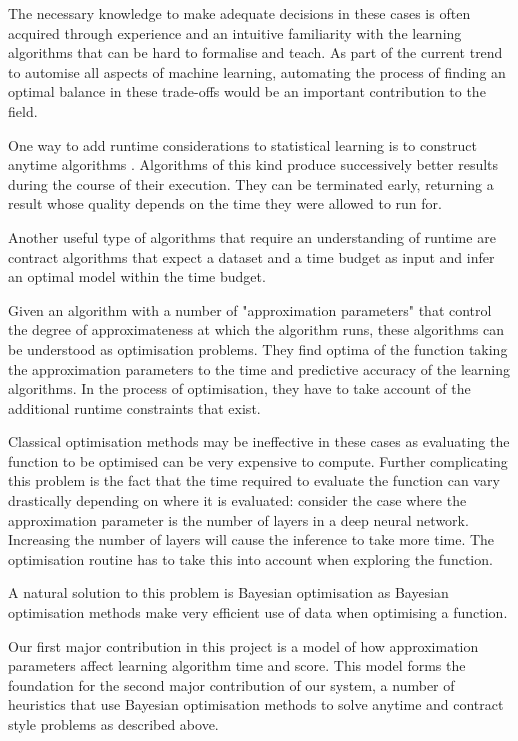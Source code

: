 \documentclass[a4paper,12pt,twoside,openright]{report}
\begin{document}
The necessary knowledge to make adequate decisions in these cases is often acquired through experience and an intuitive familiarity with the learning algorithms that can be hard to formalise and teach. As part of the current trend to automise all aspects of machine learning, automating the process of finding an optimal balance in these trade-offs would be an important contribution to the field.


One way to add runtime considerations to statistical learning is to construct anytime algorithms \cite{conf/aaai/DeanB88}. Algorithms of this kind produce successively better results during the course of their execution. They can be terminated early, returning a result whose quality depends on the time they were allowed to run for.

Another useful type of algorithms that require an understanding of runtime are contract algorithms \cite{ZCCijcai99} that expect a dataset and a time budget as input and infer an optimal model within the time budget.



Given an algorithm with a number of "approximation parameters" that control the degree of approximateness at which the algorithm runs, these algorithms can be understood as optimisation problems. They find optima of the function taking the approximation parameters to the time and predictive accuracy of the learning algorithms. In the process of optimisation, they have to take account of the additional runtime constraints that exist.

Classical optimisation methods may be ineffective in these cases as evaluating the function to be optimised can be very expensive to compute. Further complicating this problem is the fact that the time required to evaluate the function can vary drastically depending on where it is evaluated: consider the case where the approximation parameter is the number of layers in a deep neural network. Increasing the number of layers will cause the inference to take more time. The optimisation routine has to take this into account when exploring the function. 

A natural solution to this problem is Bayesian optimisation as Bayesian optimisation methods make very efficient use of data when optimising a function.


Our first major contribution in this project is a model of how approximation parameters affect learning algorithm time and score. This model forms the foundation for the second major contribution of our system, a number of heuristics that use Bayesian optimisation methods to solve anytime and contract style problems as described above.
\end{document}
